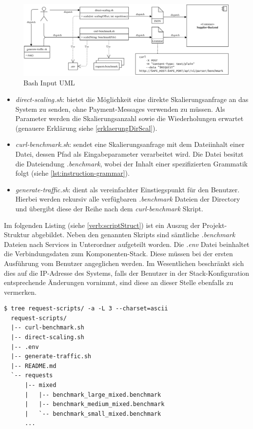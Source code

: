\begin{figure}[ht!]
	\centering
	\includegraphics[width=\linewidth]{kapitel/problemloesung/implementierung/_img/input-uml}
	\caption[Bash Input UML]{Bash Input UML}
	\label{fig:bashOverview}
\end{figure}

\begin{itemize}
  \item \emph{direct-scaling.sh}: bietet die Möglichkeit eine direkte Skalierungsanfrage an das System zu senden, ohne Payment-Messages verwenden zu müssen. Als Parameter werden die Skalierungsanzahl sowie die Wiederholungen erwartet (genauere Erklärung siehe \ref{erklaerungDirScal}).
  \item \emph{curl-benchmark.sh}: sendet eine Skalierungsanfrage mit dem Dateiinhalt einer Datei, dessen Pfad als Eingabeparameter verarbeitet wird. Die Datei besitzt die Dateiendung \emph{.benchmark}, wobei der Inhalt einer spezifizierten Grammatik folgt (siehe \ref{lst:instruction-grammar}).
  \item \emph{generate-traffic.sh}: dient als vereinfachter Einstiegspunkt für den Benutzer. Hierbei werden rekursiv alle verfügbaren \emph{.benchmark} Dateien der Directory und übergibt diese der Reihe nach dem \emph{curl-benchmark} Skript.
\end{itemize}

Im folgenden Listing (siehe \ref{verb:scriptStruct}) ist ein Auszug der Projekt-Struktur abgebildet. Neben den genannten Skripts sind sämtliche \emph{.benchmark} Dateien nach Services in Unterordner aufgeteilt worden. Die \emph{.env} Datei beinhaltet die Verbindungsdaten zum Komponenten-Stack. Diese müssen bei der ersten Ausführung vom Benutzer angeglichen werden. Im Wesentlichen beschränkt sich dies auf die IP-Adresse des Systems, falls der Benutzer in der Stack-Konfiguration entsprechende Änderungen vornimmt, sind diese an dieser Stelle ebenfalls zu vermerken.

\label{verb:scriptStruct}
\begin{minipage}{\linewidth}
\begin{lstlisting}[caption={Bash Skript - Struktur},style=bashStyle]
  $ tree request-scripts/ -a -L 3 --charset=ascii
  request-scripts/
  |-- curl-benchmark.sh
  |-- direct-scaling.sh
  |-- .env
  |-- generate-traffic.sh
  |-- README.md
  `-- requests
      |-- mixed
      |   |-- benchmark_large_mixed.benchmark
      |   |-- benchmark_medium_mixed.benchmark
      |   `-- benchmark_small_mixed.benchmark
      ...
\end{lstlisting}
\end{minipage}

